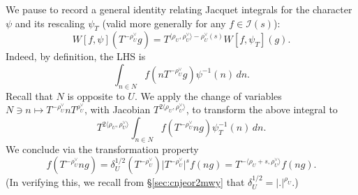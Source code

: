 \begin{enumerate}[(i)]
  We pause to record a general identity relating Jacquet integrals for the character $\psi$ and its rescaling $\psi_T$ (valid more generally for any $f \in \mathcal{I}(s)$):
  \begin{equation}\label{eq:cunvjucq6r}
    W[f, \psi](T^{-\rho_U^\vee} g) = T^{\langle \rho_U, \rho_U^\vee  \rangle - \rho_U^\vee(s)} W[f, \psi_T](g).
  \end{equation}
  Indeed, by definition, the LHS is
  \[
    \int_{n \in N} f(n T^{-\rho_U^\vee} g) \psi^{-1}(n) \,  d n.
  \]
  Recall that $N$ is opposite to $U$.  We apply the change of variables $N \ni n \mapsto T^{-\rho_U^\vee} n T^{\rho_U^\vee}$, with Jacobian $T^{2 \langle \rho_U, \rho_U^\vee  \rangle}$, to transform the above integral to
  \[
    T^{2 \langle \rho_U, \rho_U^\vee  \rangle}
    \int_{n \in N} f(T^{-\rho_U^\vee} n g) \psi_T^{-1}(n) \,  d n.
  \]
  We conclude via the transformation property
  \begin{equation*}
    f(T^{-\rho_U^\vee} n g) =
    \delta_U^{1/2}(T^{- \rho_U^\vee})
    \lvert T^{- \rho_U^\vee} \rvert^s
    f(n g)
    =
    T^{-\langle \rho_U + s,  \rho_U^\vee \rangle } f(n g).
  \end{equation*}
  (In verifying this, we recall from \S\ref{sec:cnjeor2mwy} that $\delta_U^{1/2} = \lvert . \rvert^{\rho_U}$.)


\end{enumerate}
